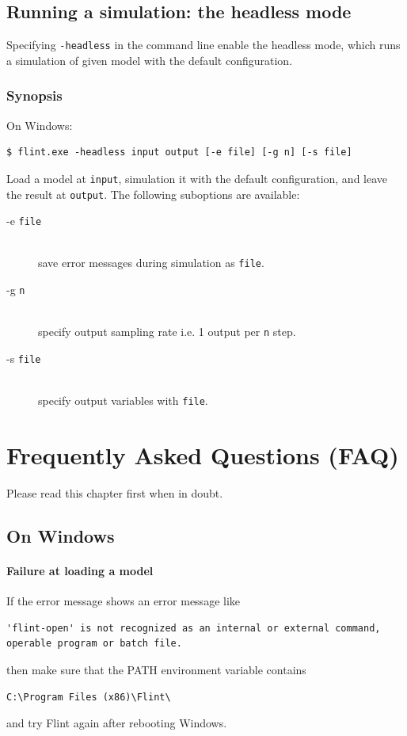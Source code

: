 \documentclass[a4paper,10pt]{report}
\def\FlintVersion{2.0}
\def\Flint{Flint \FlintVersion}
\begin{document}
\section{Running a simulation: the headless mode}
Specifying {\tt -headless} in the command line enable the headless mode, which
runs a simulation of given model with the default configuration.

\subsection{Synopsis}
On Windows:
\begin{verbatim}
$ flint.exe -headless input output [-e file] [-g n] [-s file]
\end{verbatim}
Load a model at {\tt input}, simulation it with the default configuration,
and leave the result at {\tt output}.
The following suboptions are available:
\begin{description}
\item[-e {\tt file}] \hfill \\
  save error messages during simulation as {\tt file}.
\item[-g {\tt n}] \hfill \\
  specify output sampling rate i.e. 1 output per {\tt n} step.
\item[-s {\tt file}] \hfill \\
  specify output variables with {\tt file}.
\end{description}



\chapter{Frequently Asked Questions (FAQ)}
Please read this chapter first when in doubt.

\section{On Windows}
\subsubsection{Failure at loading a model}
If the error message shows an error message like
\begin{verbatim}
'flint-open' is not recognized as an internal or external command,
operable program or batch file.
\end{verbatim}
then make sure that the PATH environment variable contains
\begin{verbatim}
C:\Program Files (x86)\Flint\
\end{verbatim}
and try Flint again after rebooting Windows.
\end{document}
